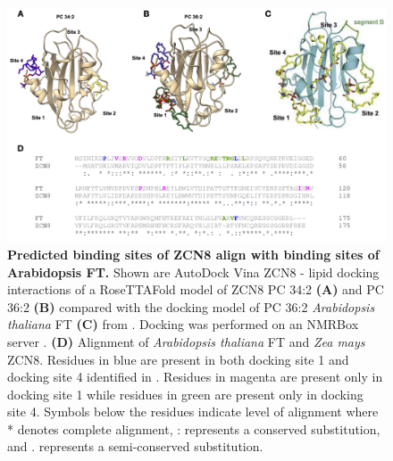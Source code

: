 \begin{subappendices}
\begin{figure}[t]
\begin{center}
\includegraphics[width=\linewidth]{Sup_Figures/Sup_Fig_12.png}
\caption[Predicted binding sites of ZCN8 align with binding sites of Arabidopsis FT.]
{\textbf{Predicted binding sites of ZCN8 align with binding sites of Arabidopsis FT.}
Shown are AutoDock Vina \cite{trott2010-su} ZCN8 - lipid docking interactions of a RoseTTAFold \cite{baek2021sci} model of ZCN8 PC 34:2 \textbf{(A)} and PC 36:2 \textbf{(B)} compared with the docking model of PC 36:2 \textit{Arabidopsis thaliana} FT \textbf{(C)} from \cite{nakamura2019-ht}. 
Docking was performed on an NMRBox server \cite{maciejewski2010bj}.
\textbf{(D)} Alignment of \textit{Arabidopsis thaliana} FT and \textit{Zea mays} ZCN8. 
Residues in blue are present in both docking site 1 and docking site 4 identified in \cite{nakamura2019-ht}. 
Residues in magenta are present only in docking site 1 while residues in green are present only in docking site 4. 
Symbols below the residues indicate level of alignment where * denotes complete alignment, : represents a conserved substitution, and . represents a semi-conserved substitution.}
\label{figure:Sup:Docking}
\end{center}
\end{figure} 



\end{subappendices}

